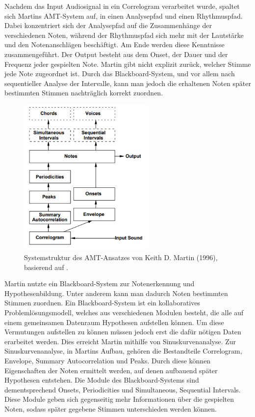 Nachdem das Input Audiosignal in ein Correlogram verarbeitet wurde,
spaltet sich Martins AMT-System auf, in einen Analysepfad und einen Rhythmuspfad.
Dabei konzentriert sich der Analysepfad auf die Zusammenhänge der verschiedenen Noten,
während der Rhythmuspfad sich mehr mit der Lautstärke und den Notenanschlägen beschäftigt.
Am Ende werden diese Kenntnisse zusammengeführt.
Der Output besteht aus dem Onset, der Dauer und der Frequenz jeder gespielten Note.
Martin gibt nicht explizit zurück, welcher Stimme jede Note zugeordnet ist.
Durch das Blackboard-System, und vor allem nach sequentieller Analyse der Intervalle, kann man
jedoch die erhaltenen Noten später bestimmten Stimmen nachträglich korrekt zuordnen.

\begin{figure}[H]
    \centering
    \includegraphics[width=0.6\textwidth]{Graphics/Martin1996Structure}
    \caption{Systemstruktur des AMT-Ansatzes von Keith D. Martin (1996), basierend auf \cite{Martin1996}.}
    \label{fig:martin-structure}
\end{figure}

Martin nutzte ein Blackboard-System zur Notenerkennung und Hypothesenbildung.
Unter anderem kann man dadurch Noten bestimmten Stimmen zuordnen.
Ein Blackboard-System ist ein kollaboratives Problemlösungsmodell, welches aus verschiedenen Modulen besteht,
die alle auf einem gemeinsamen Datenraum Hypothesen aufstellen können.
Um diese Vermutungen aufstellen zu können müssen jedoch erst die dafür nötigen Daten erarbeitet werden.
Dies erreicht Martin mithilfe von Sinuskurvenanalyse.
Zur Sinuskurvenanalyse, in Martins Aufbau, gehören die Bestandteile
Correlogram, Envelope, Summary Autocorrelation und Peaks.
Durch diese können Eigenschaften der Noten ermittelt werden, auf denen aufbauend später Hypothesen entstehen.
Die Module des Blackboard-Systems sind dementsprechend
Onsets, Periodicities und Simultaneous, Sequential Intervals.
Diese Module geben sich gegenseitig mehr Informationen über die gespielten Noten,
sodass später gegebene Stimmen unterschieden werden können.

